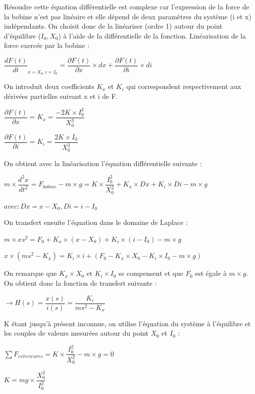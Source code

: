 \documentclass[11pt, french]{article} %
\begin{document}
\noindent
Résoudre cette équation différentielle est complexe car l'expression de la force de la bobine n'est pas linéaire et elle dépend de deux paramètres du système (i et x) indépendants. On choisit donc de la linéariser (ordre 1) autour du point d'équilibre ($I_0, X_0 $) à l'aide de la différentielle de la fonction.
Linéarisation de la force exercée par la bobine :

 \medskip
$ {\dfrac{dF(t)}{dt}}_{x = X_0, i = I_0} = \dfrac{\partial F(t)}{\partial x} \times dx + \dfrac{\partial F(t)}{\partial i} \times di $
 \medskip

\noindent
On introduit deux coefficients $ K_x $ et $ K_i $ qui correspondent respectivement aux dérivées partielles suivant x et i de F.

 \medskip
$ \dfrac{\partial F(t)}{\partial x} = K_x = \dfrac{-2K \times I_0^2}{X_0^3} $

$ \dfrac{\partial F(t)}{\partial i} = K_i = \dfrac{2K \times I_0}{X_0^2} $
 \medskip

\noindent
On obtient avec la linéarisation l'équation différentielle suivante :

 \medskip
$ m \times {\dfrac{{d^2}x}{dt^2}} = F_{bobine} - m \times g = K \times {\dfrac{I_0^2}{X_0^2}} + K_x \times Dx + K_i \times Di - m \times g $
 \medskip

$ avec : Dx = x - X_0, Di = i - I_0 $
 \medskip

\noindent
On transfert ensuite l'équation dans le domaine de Laplace :

 \medskip
$ m \times x{s^2} = F_0 + K_x \times (x - X_0) + K_i \times (i - I_0) - m \times g $

$ x \times (m{s^2} - K_x) = K_i \times i +(F_0 - K_x \times X_0 - K_i \times I_0 - m \times g) $
 \medskip

\noindent
On remarque que $K_x \times X_0 $ et $K_i \times  I_0$ se compensent et que $ F_0 $ est égale à $ m \times g $. On obtient donc la fonction de transfert suivante :

 \medskip
$ \rightarrow H(s) = \dfrac{x(s)}{i(s)} = \dfrac{K_i}{m{s^2}- K_x}  $
 \medskip

\noindent
K étant jusqu'à présent inconnue, on utilise l'équation du système à l'équilibre et les couples de valeurs mesurées autour du point $ X_0  $ et $ I_0 $ :

 \medskip
$ \sum F_{exterieures}  = K \times {\dfrac{I_0^2}{X_0^2}} - m \times g = 0 $

$ K = mg \times {\dfrac{X_0^2}{I_0^2}} $
\end{document}
